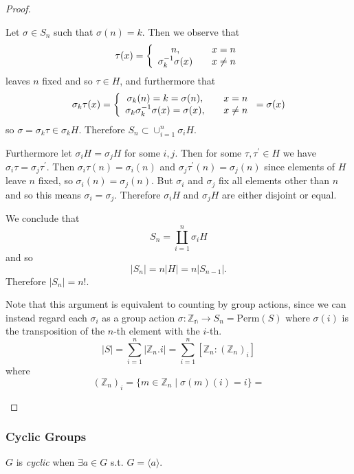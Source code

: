 \begin{proof}
\begin{enumerate}
{    Let $\sigma \in S_n$ such that $\sigma(n) = k$. Then we observe that
    $$
    \tau(x) =
    \left\{\begin{array}{c c}
      n,                    & \quad x =    n \\
      \sigma_k^{-1}\sigma(x) & \quad x \neq n
    \end{array}\right.
    $$
    leaves $n$ fixed and so $\tau \in H$, and furthermore that
    $$
    \sigma_k \tau(x) =
    \left\{\begin{array}{c c}
      \sigma_k(n) = k = \sigma(n),               & \quad x = n \\
      \sigma_k\sigma_k^{-1}\sigma(x) = \sigma(x), & \quad x \neq n
    \end{array}\right. = \sigma(x)
    $$
    so $\sigma = \sigma_k \tau \in \sigma_k H$. Therefore
    $S_n \subset \cup_{i=1}^n \sigma_i H$.

    Furthermore let $\sigma_i H = \sigma_j H$ for some $i, j$. Then
    for some $\tau, \tau^\prime \in H$ we have
    $\sigma_i \tau = \sigma_j \tau^\prime$. Then
    $\sigma_i \tau (n) = \sigma_i (n)$ and
    $\sigma_j \tau^\prime (n) = \sigma_j (n)$
    since elements of $H$ leave $n$ fixed, so
    $\sigma_i(n) = \sigma_j(n)$. But $\sigma_i$ and $\sigma_j$ fix all
    elements other than $n$ and so this means $\sigma_i =
    \sigma_j$. Therefore $\sigma_i H$ and $\sigma_j H$ are either
    disjoint or equal.

    We conclude that
    $$
    S_n = \coprod_{i=1}^n \sigma_i H
    $$
    and so
    $$
    |S_n| = n |H| = n |S_{n-1}|.
    $$
    Therefore $|S_n| = n!$.

    Note that this argument is equivalent to counting by
    group actions, since we can instead regard each $\sigma_i$
    as a group action
    $\sigma : \mathbb{Z_n} \to S_n = \mathrm{Perm}(S)$ where
    $\sigma(i)$ is the transposition of the $n$-th element with the
    $i$-th.
    $$
    |S| = \sum_{i=1}^n |\mathbb{Z}_n . i|
        = \sum_{i=1}^n [\mathbb{Z}_n : (\mathbb{Z}_n)_i]
    $$
    where
    $$
    (\mathbb{Z}_n)_i = \{ m \in \mathbb{Z}_n \mid \sigma(m)(i) = i \}
                    =
    $$
  }
\end{enumerate}

\end{proof}

\subsubsection{Cyclic Groups}
\begin{defn}
$G$ is \emph{cyclic} when $\exists a \in G$ s.t.
$G = \langle a \rangle$.
\end{defn}

